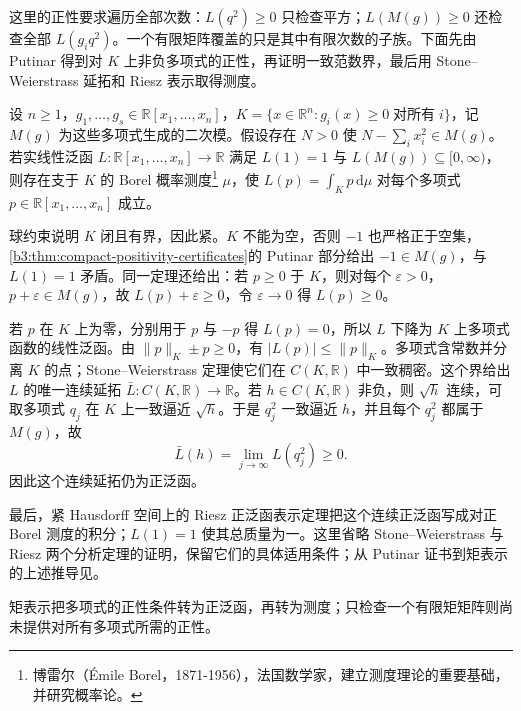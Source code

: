 这里的正性要求遍历全部次数：\(L(q^2)\ge0\) 只检查平方；\(L(M(g))\ge0\) 还检查全部 \(L(g_iq^2)\)。一个有限矩阵覆盖的只是其中有限次数的子族。下面先由 Putinar 得到对 \(K\) 上非负多项式的正性，再证明一致范数界，最后用 Stone--Weierstrass 延拓和 Riesz 表示取得测度。

\begin{theorem}\label{b3:thm:archimedean-moment-representation}
	设 \(n\ge1\)，\(g_1,\ldots,g_s\in\mathbb R[x_1,\ldots,x_n]\)，\(K=\{x\in\mathbb R^n:g_i(x)\ge0\;\text{对所有}\;i\}\)，记 \(M(g)\) 为这些多项式生成的二次模。假设存在 \(N>0\) 使 \(N-\sum_i x_i^2\in M(g)\)。若实线性泛函 \(L:\mathbb R[x_1,\ldots,x_n]\to\mathbb R\) 满足 \(L(1)=1\) 与 \(L(M(g))\subseteq[0,\infty)\)，则存在支于 \(K\) 的 Borel 概率测度\footnote{博雷尔（Émile Borel，1871-1956），法国数学家，建立测度理论的重要基础，并研究概率论。} \(\mu\)，使 \(L(p)=\int_Kp\,\mathrm{d}\mu\) 对每个多项式 \(p\in\mathbb R[x_1,\ldots,x_n]\) 成立。
\end{theorem}
\begin{proofsketch}
	球约束说明 \(K\) 闭且有界，因此紧。\(K\) 不能为空，否则 \(-1\) 也严格正于空集，\cref{b3:thm:compact-positivity-certificates}的 Putinar 部分给出 \(-1\in M(g)\)，与 \(L(1)=1\) 矛盾。同一定理还给出：若 \(p\ge0\) 于 \(K\)，则对每个 \(\varepsilon>0\)，\(p+\varepsilon\in M(g)\)，故 \(L(p)+\varepsilon\ge0\)，令 \(\varepsilon\to0\) 得 \(L(p)\ge0\)。

	若 \(p\) 在 \(K\) 上为零，分别用于 \(p\) 与 \(-p\) 得 \(L(p)=0\)，所以 \(L\) 下降为 \(K\) 上多项式函数的线性泛函。由 \(\|p\|_K\pm p\ge0\)，有 \(|L(p)|\le\|p\|_K\)。多项式含常数并分离 \(K\) 的点；Stone--Weierstrass 定理使它们在 \(C(K,\mathbb R)\) 中一致稠密。这个界给出 \(L\) 的唯一连续延拓 \(\bar L:C(K,\mathbb R)\to\mathbb R\)。若 \(h\in C(K,\mathbb R)\) 非负，则 \(\sqrt h\) 连续，可取多项式 \(q_j\) 在 \(K\) 上一致逼近 \(\sqrt h\)。于是 \(q_j^2\) 一致逼近 \(h\)，并且每个 \(q_j^2\) 都属于 \(M(g)\)，故
	\[
		\bar L(h)=\lim_{j\to\infty}L(q_j^2)\ge0.
	\]
	因此这个连续延拓仍为正泛函。

	最后，紧 Hausdorff 空间上的 Riesz 正泛函表示定理把这个连续正泛函写成对正 Borel 测度的积分；\(L(1)=1\) 使其总质量为一。这里省略 Stone--Weierstrass 与 Riesz 两个分析定理的证明，保留它们的具体适用条件；从 Putinar 证书到矩表示的上述推导见\cite[Section 1, Theorem 2; Section 3, proof of Theorem 2]{Schweighofer2005Optimization}。
\end{proofsketch}

矩表示把多项式的正性条件转为正泛函，再转为测度；只检查一个有限矩矩阵则尚未提供对所有多项式所需的正性。


